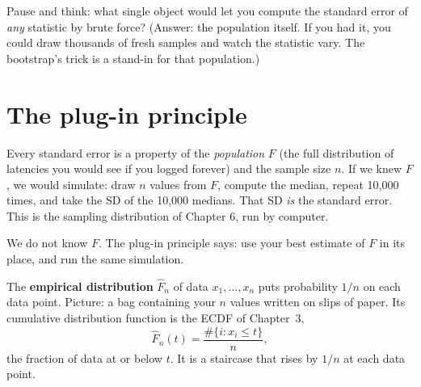 \begin{recoverybox}
Pause and think: what single object would let you compute the standard error
of \emph{any} statistic by brute force? (Answer: the population itself. If you
had it, you could draw thousands of fresh samples and watch the statistic vary.
The bootstrap's trick is a stand-in for that population.)
\end{recoverybox}

\section{The plug-in principle}
\label{sec:boot-plugin}

Every standard error is a property of the \emph{population} $F$ (the full
distribution of latencies you would see if you logged forever) and the sample
size $n$. If we knew $F$, we would simulate: draw $n$ values from $F$, compute
the median, repeat 10{,}000 times, and take the SD of the 10{,}000 medians.
That SD \emph{is} the standard error. This is the sampling distribution of
Chapter 6, run by computer.

We do not know $F$. The plug-in principle says: use your best estimate of $F$
in its place, and run the same simulation.

\begin{definition}
The \textbf{empirical distribution} $\hat F_n$ of data $x_1,\dots,x_n$ puts
probability $1/n$ on each data point. Picture: a bag containing your $n$
values written on slips of paper. Its cumulative distribution function is the
ECDF of Chapter~3,
\[
  \hat F_n(t) = \frac{\#\{i : x_i \le t\}}{n},
\]
the fraction of data at or below $t$. It is a staircase that rises by $1/n$ at
each data point.
\end{definition}

